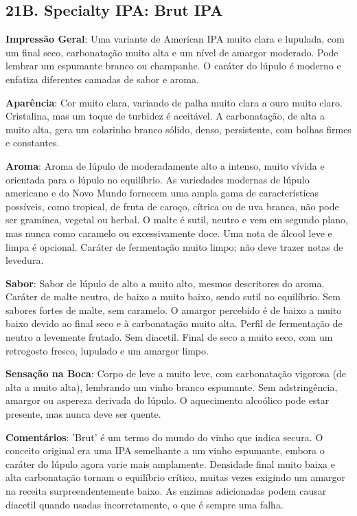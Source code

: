 \subsection*{21B. Specialty IPA: Brut IPA}
\textbf{Impressão Geral}: Uma variante de American IPA muito clara e lupulada, com um final seco, carbonatação muito alta e um nível de amargor moderado. Pode lembrar um espumante branco ou champanhe. O caráter do lúpulo é moderno e enfatiza diferentes camadas de sabor e aroma.

\textbf{Aparência}: Cor muito clara, variando de palha muito clara a ouro muito claro. Cristalina, mas um toque de turbidez é aceitável. A carbonatação, de alta a muito alta, gera um colarinho branco sólido, denso, persistente, com bolhas firmes e constantes.

\textbf{Aroma}: Aroma de lúpulo de moderadamente alto a intenso, muito vívida e orientada para o lúpulo no equilíbrio. As variedades modernas de lúpulo americano e do Novo Mundo fornecem uma ampla gama de características possíveis, como tropical, de fruta de caroço, cítrica ou de uva branca, não pode ser gramínea, vegetal ou herbal. O malte é sutil, neutro e vem em segundo plano, mas nunca como caramelo ou excessivamente doce. Uma nota de álcool leve e limpa é opcional. Caráter de fermentação muito limpo; não deve trazer notas de levedura.

\textbf{Sabor}: Sabor de lúpulo de alto a muito alto, mesmos descritores do aroma. Caráter de malte neutro, de baixo a muito baixo, sendo sutil no equilíbrio. Sem sabores fortes de malte, sem caramelo. O amargor percebido é de baixo a muito baixo devido ao final seco e à carbonatação muito alta. Perfil de fermentação de neutro a levemente frutado. Sem diacetil. Final de seco a muito seco, com um retrogosto fresco, lupulado e um amargor limpo.

\textbf{Sensação na Boca}: Corpo de leve a muito leve, com carbonatação vigorosa (de alta a muito alta), lembrando um vinho branco espumante. Sem adstringência, amargor ou aspereza derivada do lúpulo. O aquecimento alcoólico pode estar presente, mas nunca deve ser quente.

\textbf{Comentários}: 'Brut' é um termo do mundo do vinho que indica secura. O conceito original era uma IPA semelhante a um vinho espumante, embora o caráter do lúpulo agora varie mais amplamente. Densidade final muito baixa e alta carbonatação tornam o equilíbrio crítico, muitas vezes exigindo um amargor na receita surpreendentemente baixo. As enzimas adicionadas podem causar diacetil quando usadas incorretamente, o que é sempre uma falha.

